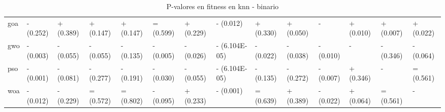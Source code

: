 \begin{sidewaystable}[htp]
\begin{adjustbox}{width=\linewidth}
\begin{tabular}{llllllllllllll}
            goa   & - (0.252) & + (0.389) & + (0.147) & + (0.147)     & = (0.599) & + (0.229) & - (0.012)     & + (0.330) & + (0.050) & -         & + (0.010)     & + (0.007)     & + (0.022) \\
            gwo   & - (0.003) & - (0.055) & - (0.055) & - (0.135)     & - (0.005) & - (0.026) & - (6.104E-05) & - (0.022) & - (0.038) & - (0.010) & -             & - (0.346)     & - (0.064) \\
            pso   & - (0.001) & - (0.081) & - (0.277) & - (0.191)     & - (0.030) & - (0.055) & - (6.104E-05) & - (0.135) & - (0.272) & - (0.007) & + (0.346)     & -             & = (0.561) \\
            woa   & - (0.012) & - (0.229) & = (0.572) & = (0.802)     & - (0.095) & + (0.233) & - (0.001)     & = (0.639) & + (0.389) & - (0.022) & + (0.064)     & = (0.561)     & -         \\
            \bottomrule
        \end{tabular}
    \end{adjustbox}
    \caption{P-valores en fitness en knn - binario}
\end{sidewaystable}

